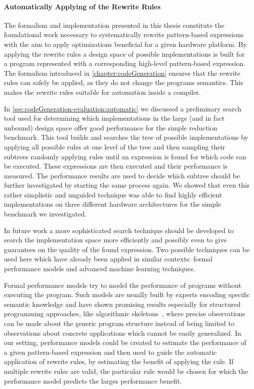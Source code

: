 \paragraph{Automatically Applying of the Rewrite Rules}
The formalism and implementation presented in this thesis constitute the foundational work necessary to systematically rewrite pattern-based expressions with the aim to apply optimizations beneficial for a given hardware platform.
By applying the rewrite rules a design space of possible implementations is built for a program represented with a corresponding high-level pattern-based expression.
The formalism introduced in \autoref{chapter:codeGeneration} ensures that the rewrite rules can safely be applied, as they do not change the programs semantics.
This makes the rewrite rules suitable for automation inside a compiler.

In \autoref{sec:codeGeneration-evaluation:automatic} we discussed a preliminary search tool used for determining which implementations in the large (and in fact unbound) design space offer good performance for the simple reduction benchmark.
This tool builds and searches the tree of possible implementations by applying all possible rules at one level of the tree and then sampling their subtrees randomly applying rules until an expression is found for which \OpenCL code can be executed.
These expressions are then executed and their performance is measured.
The performance results are used to decide which subtree should be further investigated by starting the same process again.
We showed that even this rather simplistic and unguided technique was able to find highly efficient implementations on three different hardware architectures for the simple benchmark we investigated.

In future work a more sophisticated search technique should be developed to search the implementation space more efficiently and possibly even to give guarantees on the quality of the found expression.
Two possible techniques can be used here which have already been applied in similar contexts:
formal performance models and advanced machine learning techniques.

Formal performance models try to model the performance of programs without executing the program.
Such models are usually built by experts encoding specific semantic knowledge and have shown promising results especially for structured programming approaches, like algorithmic skeletons~\cite{DarlingtonFHKSW93,Alt2007,HayashiC02}, where precise observations can be made about the generic program structure instead of being limited to observations about concrete applications which cannot be easily generalized.
In our setting, performance models could be created to estimate the performance of a given pattern-based expression and then used to guide the automatic application of rewrite rules, by estimating the benefit of applying the rule.
If multiple rewrite rules are valid, the particular rule would be chosen for which the performance model predicts the larges performance benefit.

